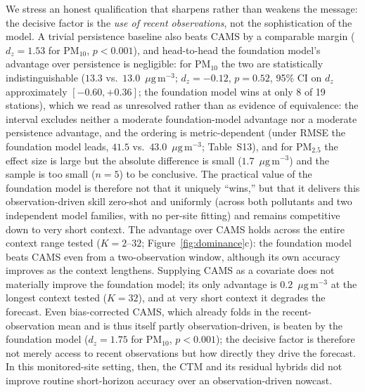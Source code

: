 \documentclass[review,times,authoryear]{elsarticle}
\newcommand*{\ugm}{\ensuremath{\mu\mathrm{g\,m^{-3}}}}
\newcommand*{\pmtf}{\ensuremath{\mathrm{PM_{2.5}}}}
\newcommand*{\pmten}{\ensuremath{\mathrm{PM_{10}}}}
\begin{document}
We stress an honest qualification that sharpens rather than weakens the message: the decisive factor is the \emph{use of recent observations}, not the sophistication of the model. A trivial persistence baseline also beats CAMS by a comparable margin ($d_z=1.53$ for \pmten{}, $p<0.001$), and head-to-head the foundation model's advantage over persistence is negligible: for \pmten{} the two are statistically indistinguishable ($13.3$ vs.\ $13.0$~\ugm; $d_z=-0.12$, $p=0.52$, 95\% CI on $d_z$ approximately $[-0.60,+0.36]$; the foundation model wins at only 8 of 19 stations), which we read as unresolved rather than as evidence of equivalence: the interval excludes neither a moderate foundation-model advantage nor a moderate persistence advantage, and the ordering is metric-dependent (under RMSE the foundation model leads, $41.5$ vs.\ $43.0$~\ugm; Table~S13), and for \pmtf{} the effect size is large but the absolute difference is small ($1.7$~\ugm) and the sample is too small ($n=5$) to be conclusive. The practical value of the foundation model is therefore not that it uniquely ``wins,'' but that it delivers this observation-driven skill zero-shot and uniformly (across both pollutants and two independent model families, with no per-site fitting) and remains competitive down to very short context. The advantage over CAMS holds across the entire context range tested ($K=2$--$32$; Figure~\ref{fig:dominance}c): the foundation model beats CAMS even from a two-observation window, although its own accuracy improves as the context lengthens. Supplying CAMS as a covariate does not materially improve the foundation model; its only advantage is $0.2$~\ugm{} at the longest context tested ($K=32$), and at very short context it degrades the forecast. Even bias-corrected CAMS, which already folds in the recent-observation mean and is thus itself partly observation-driven, is beaten by the foundation model ($d_z=1.75$ for \pmten{}, $p<0.001$); the decisive factor is therefore not merely access to recent observations but how directly they drive the forecast. In this monitored-site setting, then, the CTM and its residual hybrids did not improve routine short-horizon accuracy over an observation-driven nowcast.
\end{document}
